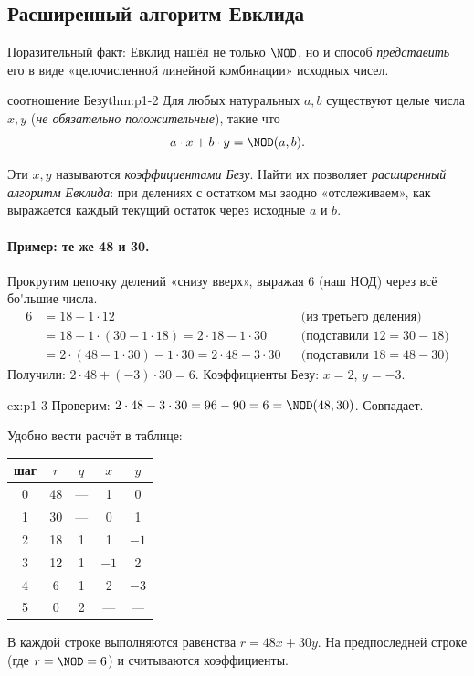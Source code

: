 \subsection{Расширенный алгоритм Евклида}

Поразительный факт: Евклид нашёл не только $\NOD$, но и способ \emph{представить} его в виде «целочисленной линейной комбинации» исходных чисел.

\begin{theorem}{соотношение Безу}{thm:p1-2}
\label{thm:bezout}
Для любых натуральных $a, b$ существуют целые числа $x, y$ (\emph{не обязательно положительные}), такие что
\[
a\cdot x + b\cdot y = \NOD(a,b).
\]
\end{theorem}

Эти $x, y$ называются \emph{коэффициентами Безу}. Найти их позволяет \emph{расширенный алгоритм Евклида}: при делениях с остатком мы заодно «отслеживаем», как выражается каждый текущий остаток через исходные $a$ и $b$.

\paragraph*{Пример: те же 48 и 30.} Прокрутим цепочку делений «снизу вверх», выражая 6 (наш НОД) через всё бо\'{}льшие числа.
\begin{align*}
6 &= 18 - 1\cdot 12 && \text{(из третьего деления)}\\
  &= 18 - 1\cdot (30 - 1\cdot 18) = 2\cdot 18 - 1\cdot 30 && \text{(подставили } 12 = 30 - 18 \text{)}\\
  &= 2\cdot (48 - 1\cdot 30) - 1\cdot 30 = 2\cdot 48 - 3\cdot 30 && \text{(подставили } 18 = 48 - 30 \text{)}
\end{align*}
Получили: $\boxed{2\cdot 48 + (-3)\cdot 30 = 6}$. Коэффициенты Безу: $x = 2$, $y = -3$.

\begin{example}{}{ex:p1-3}
Проверим: $2\cdot 48 - 3\cdot 30 = 96 - 90 = 6 = \NOD(48,30)$. Совпадает.
\end{example}

Удобно вести расчёт в таблице:
\begin{center}
\begin{tabular}{|c|c|c|c|c|}
\hline
шаг & $r$ & $q$ & $x$ & $y$ \\\hline
0 & 48 & --- & 1 & 0\\
1 & 30 & --- & 0 & 1\\
2 & 18 & 1 & 1 & $-1$\\
3 & 12 & 1 & $-1$ & 2\\
4 & 6  & 1 & 2 & $-3$\\
5 & 0  & 2 & --- & ---\\\hline
\end{tabular}
\end{center}
В каждой строке выполняются равенства $r = 48 x + 30 y$. На предпоследней строке (где $r = \NOD = 6$) и считываются коэффициенты.

